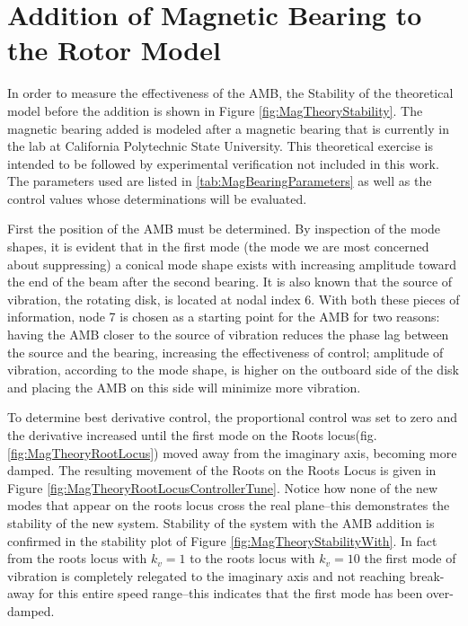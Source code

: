 \section{Addition of Magnetic Bearing to the Rotor Model}
In order to measure the effectiveness of the AMB, the Stability of the theoretical model before the addition is shown in Figure \ref{fig:MagTheoryStability}. The magnetic bearing added is modeled after a magnetic bearing that is currently in the lab at California Polytechnic State University. This theoretical exercise is intended to be followed by experimental verification not included in this work. The parameters used are listed in \ref{tab:MagBearingParameters} as well as the control values whose determinations will be evaluated.\par 
First the position of the AMB must be determined. By inspection of the mode shapes, it is evident that in the first mode (the mode we are most concerned about suppressing) a conical mode shape exists with increasing amplitude toward the end of the beam after the second bearing. It is also known that the source of vibration, the rotating disk, is located at nodal index 6. With both these pieces of information, node 7 is chosen as a starting point for the AMB for two reasons: having the AMB closer to the source of vibration reduces the phase lag between the source and the bearing, increasing the effectiveness of control; amplitude of vibration, according to the mode shape, is higher on the outboard side of the disk and placing the AMB on this side will minimize more vibration.\par 
 To determine best derivative control, the proportional control was set to zero and the derivative increased until the first mode on the Roots locus(fig. \ref{fig:MagTheoryRootLocus}) moved away from the imaginary axis, becoming more damped. The resulting movement of the Roots on the Roots Locus is given in Figure \ref{fig:MagTheoryRootLocusControllerTune}. Notice how none of the new modes that appear on the roots locus cross the real plane--this demonstrates the stability of the new system. Stability of the system with the AMB addition is confirmed in the stability plot of Figure \ref{fig:MagTheoryStabilityWith}. In fact from the roots locus with $ k_v=1 $ to the roots locus with $ k_v=10 $ the first mode of vibration is completely relegated to the imaginary axis and not reaching break-away for this entire speed range--this indicates that the first mode has been over-damped.\par 
